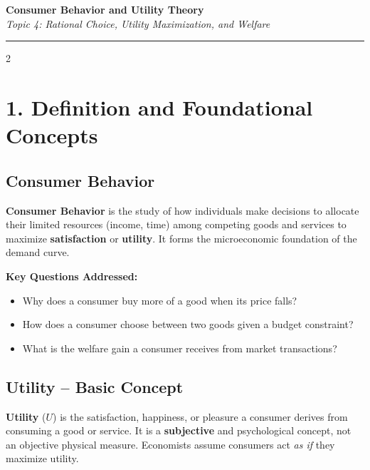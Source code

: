 \documentclass[10pt,a4paper]{article}
\begin{document}
\begin{center}
{\LARGE \textbf{Consumer Behavior and Utility Theory}}\\[0.15cm]
{\normalsize \textit{Topic 4: Rational Choice, Utility Maximization, and Welfare}}\\[0.15cm]
\hrule
\end{center}
\vspace{-0.3cm}

\begin{multicols}{2}
\footnotesize

\section*{1. Definition and Foundational Concepts}

\subsection*{Consumer Behavior}
\textbf{Consumer Behavior} is the study of how individuals make decisions to allocate their limited resources (income, time) among competing goods and services to maximize \textbf{satisfaction} or \textbf{utility}. It forms the microeconomic foundation of the demand curve.

\textbf{Key Questions Addressed:}
\begin{itemize}[leftmargin=*,nosep]
    \item Why does a consumer buy more of a good when its price falls?
    \item How does a consumer choose between two goods given a budget constraint?
    \item What is the welfare gain a consumer receives from market transactions?
\end{itemize}

\subsection*{Utility -- Basic Concept}
\textbf{Utility} ($U$) is the satisfaction, happiness, or pleasure a consumer derives from consuming a good or service. It is a \textbf{subjective} and psychological concept, not an objective physical measure. Economists assume consumers act \textit{as if} they maximize utility.


\end{multicols}
\end{document}
